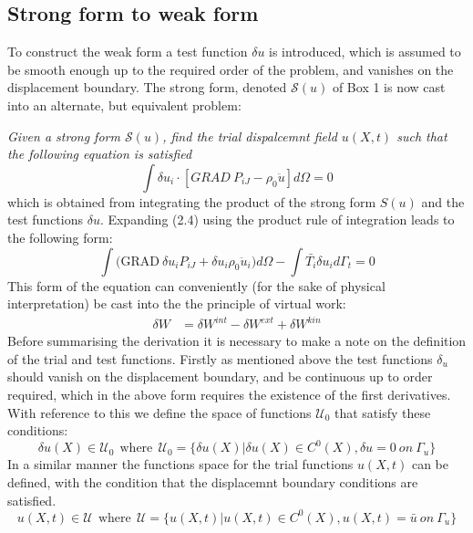 \subsection*{Strong form to weak form }
To construct the weak form a test function $\delta u$ is introduced, which is assumed to be smooth enough up to the required order of the problem, and vanishes on the displacement boundary. The strong form, denoted $\mathcal{S}(u)$ of Box 1 is now cast into an alternate, but equivalent problem: 
\vspace{0.5cm}

\noindent\emph{Given a strong form $\mathcal{S}(u)$, find the trial dispalcemnt field $u(X,t)$ such that the following equation is satisfied }
\begin{equation}
\int{\delta u_i \cdot [GRAD ~P_{iJ} - \rho_0 \ddot{u}     ] d\Omega} = 0
\end{equation}
which is obtained from integrating the product of the strong form $S(u)$ and the test functions $\delta u$. Expanding (2.4) using the product rule of integration leads to the following form: 
\begin{equation}
\int{\big(\text{GRAD}~\delta u_i P_{iJ} + \delta u_i \rho_0 \ddot{u}_i \big) d\Omega     } - \int{\bar{T_i} \delta u_i d \Gamma_t} = 0
\end{equation}
This form of the equation can conveniently (for the sake of physical interpretation) be cast into the the principle of virtual work:
\begin{align}
\delta W &= \delta W^{int} - \delta W^{ext} + \delta W^{kin} 
\end{align}
Before summarising the derivation it is necessary to make a note on the definition of the trial and test functions. Firstly as mentioned above the test functions $\delta_u$ should vanish on the displacement boundary, and be continuous up to order required, which in the above form requires the existence of the first derivatives. With reference to this we define the space of functions $\mathcal{U}_0$ that satisfy these conditions:
\begin{equation}
\delta u(X) \in \mathcal{U}_0 ~~ \text{where} ~~ \mathcal{U}_0 = \{ \delta u(X) | \delta u(X) \in C^0(X), \delta u = 0 ~on~ \Gamma_u         \}
\end{equation}
In a similar manner the functions space for the trial functions $u(X,t)$ can be defined, with the condition that the displacemnt boundary conditions are satisfied. 
\begin{equation}
 u(X,t) \in \mathcal{U} ~~ \text{where} ~~ \mathcal{U} = \{u(X,t) | u(X,t) \in C^0(X), u(X,t) = \bar{u} ~on~ \Gamma_u         \}
\end{equation}
